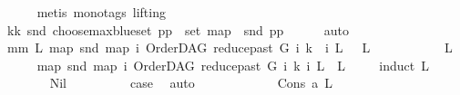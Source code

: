 \begin{isabellebody}
\ \ \ \ \isamarkupfalse%
\ {\isacharparenleft}{\kern0pt}metis\ {\isacharparenleft}{\kern0pt}mono{\isacharunderscore}{\kern0pt}tags{\isacharcomma}{\kern0pt}\ lifting{\isacharparenright}{\kern0pt}{\isacharparenright}{\kern0pt}\ \ \isanewline
\ \ \isamarkupfalse%
\ \isamarkupfalse%
\ kk{\isacharcolon}{\kern0pt}\ {\isachardoublequoteopen}snd\ {\isacharparenleft}{\kern0pt}choose{\isacharunderscore}{\kern0pt}max{\isacharunderscore}{\kern0pt}blue{\isacharunderscore}{\kern0pt}set\ pp{\isacharparenright}{\kern0pt}\ {\isasymin}\ set\ {\isacharparenleft}{\kern0pt}map\ \ snd\ pp{\isacharparenright}{\kern0pt}{\isachardoublequoteclose}\isanewline
\ \ \ \ \isamarkupfalse%
\ auto\ \isanewline
\ \ \isamarkupfalse%
\ mm{}{\isacharcolon}{\kern0pt}\ {\isachardoublequoteopen}{\isasymAnd}L{\isachardot}{\kern0pt}\ {\isacharparenleft}{\kern0pt}map\ snd\ {\isacharparenleft}{\kern0pt}map\ {\isacharparenleft}{\kern0pt}{\isasymlambda}i{\isachardot}{\kern0pt}\ {\isacharparenleft}{\kern0pt}{\isacharparenleft}{\kern0pt}OrderDAG\ {\isacharparenleft}{\kern0pt}reduce{\isacharunderscore}{\kern0pt}past\ G\ i{\isacharparenright}{\kern0pt}\ k{\isacharparenright}{\kern0pt}\ {\isacharcomma}{\kern0pt}\ i{\isacharparenright}{\kern0pt}{\isacharparenright}{\kern0pt}\ L{\isacharparenright}{\kern0pt}{\isacharparenright}{\kern0pt}\ {\isacharequal}{\kern0pt}\ \ L{\isachardoublequoteclose}\ \isanewline
\ \ \isamarkupfalse%
\ {\isacharminus}{\kern0pt}\isanewline
\ \ \ \ \isamarkupfalse%
\ L\isanewline
\ \ \ \ \isamarkupfalse%
\ {\isachardoublequoteopen}map\ snd\ {\isacharparenleft}{\kern0pt}map\ {\isacharparenleft}{\kern0pt}{\isasymlambda}i{\isachardot}{\kern0pt}\ {\isacharparenleft}{\kern0pt}OrderDAG\ {\isacharparenleft}{\kern0pt}reduce{\isacharunderscore}{\kern0pt}past\ G\ i{\isacharparenright}{\kern0pt}\ k{\isacharcomma}{\kern0pt}\ i{\isacharparenright}{\kern0pt}{\isacharparenright}{\kern0pt}\ L{\isacharparenright}{\kern0pt}\ {\isacharequal}{\kern0pt}\ L{\isachardoublequoteclose}\isanewline
\ \ \ \ \isamarkupfalse%
{\isacharparenleft}{\kern0pt}induct\ L{\isacharparenright}{\kern0pt}\isanewline
\ \ \ \ \ \ \isamarkupfalse%
\ Nil\isanewline
\ \ \ \ \ \ \isamarkupfalse%
\ \isamarkupfalse%
\ {\isacharquery}{\kern0pt}case\ \isamarkupfalse%
\ auto\isanewline
\ \ \ \ \isamarkupfalse%
\isanewline
\ \ \ \ \ \ \isamarkupfalse%
\ {\isacharparenleft}{\kern0pt}Cons\ a\ L{\isacharparenright}{\kern0pt}\isanewline

\end{isabellebody}
